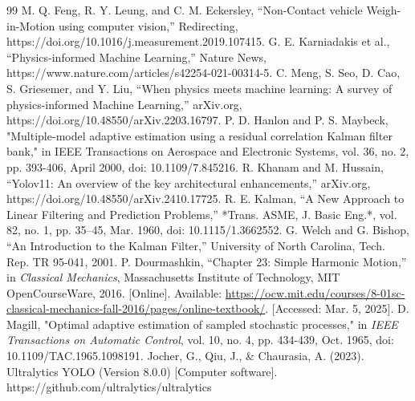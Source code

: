 \documentclass[letterpaper, 10 pt, conference]{ieeeconf}  %
\begin{document}
\begin{thebibliography}{99}
 M. Q. Feng, R. Y. Leung, and C. M. Eckersley, “Non-Contact vehicle Weigh-in-Motion using computer vision,” Redirecting, https://doi.org/10.1016/j.measurement.2019.107415. 
 G. E. Karniadakis et al., “Physics-informed Machine Learning,” Nature News, https://www.nature.com/articles/s42254-021-00314-5. 
 C. Meng, S. Seo, D. Cao, S. Griesemer, and Y. Liu, “When physics meets machine learning: A survey of physics-informed Machine Learning,” arXiv.org, https://doi.org/10.48550/arXiv.2203.16797.
 P. D. Hanlon and P. S. Maybeck, "Multiple-model adaptive estimation using a residual correlation Kalman filter bank," in IEEE Transactions on Aerospace and Electronic Systems, vol. 36, no. 2, pp. 393-406, April 2000, doi: 10.1109/7.845216.
 R. Khanam and M. Hussain, “Yolov11: An overview of the key architectural enhancements,” arXiv.org, https://doi.org/10.48550/arXiv.2410.17725. 
 R. E. Kalman, “A New Approach to Linear Filtering and Prediction Problems,” *Trans. ASME, J. Basic Eng.*, vol. 82, no. 1, pp. 35–45, Mar. 1960, doi: 10.1115/1.3662552.
 G. Welch and G. Bishop, “An Introduction to the Kalman Filter,” University of North Carolina, Tech. Rep. TR 95-041, 2001.
 P. Dourmashkin, “Chapter 23: Simple Harmonic Motion,” in \textit{Classical Mechanics}, Massachusetts Institute of Technology, MIT OpenCourseWare, 2016. [Online]. Available: \url{https://ocw.mit.edu/courses/8-01sc-classical-mechanics-fall-2016/pages/online-textbook/}. [Accessed: Mar. 5, 2025].
 D. Magill, "Optimal adaptive estimation of sampled stochastic processes," in \textit{IEEE Transactions on Automatic Control}, vol. 10, no. 4, pp. 434-439, Oct. 1965, doi: 10.1109/TAC.1965.1098191.
 Jocher, G., Qiu, J., \& Chaurasia, A. (2023). Ultralytics YOLO (Version 8.0.0) [Computer software]. https://github.com/ultralytics/ultralytics


\end{thebibliography}
\end{document}

